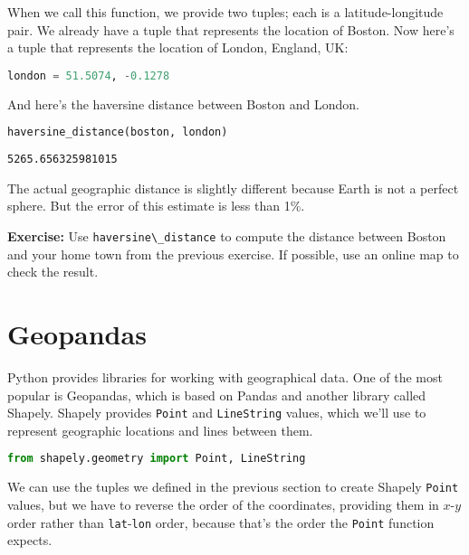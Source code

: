 When we call this function, we provide two tuples; each is a
latitude-longitude pair. We already have a tuple that represents the
location of Boston. Now here's a tuple that represents the location of
London, England, UK:

\begin{lstlisting}[language=Python,style=source]
london = 51.5074, -0.1278
\end{lstlisting}

And here's the haversine distance between Boston and London.

\begin{lstlisting}[language=Python,style=source]
haversine_distance(boston, london)
\end{lstlisting}

\begin{lstlisting}[style=output]
5265.656325981015
\end{lstlisting}

The actual geographic distance is slightly different because Earth is
not a perfect sphere. But the error of this estimate is less than 1\%.

\textbf{Exercise:} Use \passthrough{\lstinline!haversine\_distance!} to
compute the distance between Boston and your home town from the previous
exercise. If possible, use an online map to check the result.

\hypertarget{geopandas}{%
\section{Geopandas}\label{geopandas}}

Python provides libraries for working with geographical data. One of the
most popular is Geopandas, which is based on Pandas and another library
called Shapely. Shapely provides \passthrough{\lstinline!Point!} and
\passthrough{\lstinline!LineString!} values, which we'll use to
represent geographic locations and lines between them.

\begin{lstlisting}[language=Python,style=source]
from shapely.geometry import Point, LineString
\end{lstlisting}

We can use the tuples we defined in the previous section to create
Shapely \passthrough{\lstinline!Point!} values, but we have to reverse
the order of the coordinates, providing them in \(x\)-\(y\) order rather
than \passthrough{\lstinline!lat!}-\passthrough{\lstinline!lon!} order,
because that's the order the \passthrough{\lstinline!Point!} function
expects.

